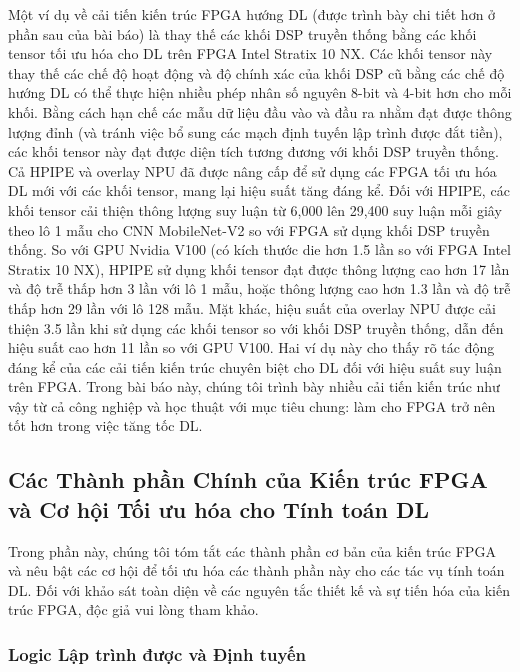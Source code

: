 \documentclass[a4paper]{article}
\begin{document}
    Một ví dụ về cải tiến kiến trúc FPGA hướng DL (được trình bày chi tiết hơn ở phần sau của bài báo) là thay thế các khối DSP truyền thống bằng các khối tensor tối ưu hóa cho DL trên FPGA Intel Stratix 10 NX. Các khối tensor này thay thế các chế độ hoạt động và độ chính xác của khối DSP cũ bằng các chế độ hướng DL có thể thực hiện nhiều phép nhân số nguyên 8-bit và 4-bit hơn cho mỗi khối. Bằng cách hạn chế các mẫu dữ liệu đầu vào và đầu ra nhằm đạt được thông lượng đỉnh (và tránh việc bổ sung các mạch định tuyến lập trình được đắt tiền), các khối tensor này đạt được diện tích tương đương với khối DSP truyền thống. Cả HPIPE và overlay NPU đã được nâng cấp để sử dụng các FPGA tối ưu hóa DL mới với các khối tensor, mang lại hiệu suất tăng đáng kể. Đối với HPIPE, các khối tensor cải thiện thông lượng suy luận từ 6,000 lên 29,400 suy luận mỗi giây theo lô 1 mẫu cho CNN MobileNet-V2 so với FPGA sử dụng khối DSP truyền thống. So với GPU Nvidia V100 (có kích thước die hơn 1.5 lần so với FPGA Intel Stratix 10 NX), HPIPE sử dụng khối tensor đạt được thông lượng cao hơn 17 lần và độ trễ thấp hơn 3 lần với lô 1 mẫu, hoặc thông lượng cao hơn 1.3 lần và độ trễ thấp hơn 29 lần với lô 128 mẫu. Mặt khác, hiệu suất của overlay NPU được cải thiện 3.5 lần khi sử dụng các khối tensor so với khối DSP truyền thống, dẫn đến hiệu suất cao hơn 11 lần so với GPU V100. Hai ví dụ này cho thấy rõ tác động đáng kể của các cải tiến kiến trúc chuyên biệt cho DL đối với hiệu suất suy luận trên FPGA. Trong bài báo này, chúng tôi trình bày nhiều cải tiến kiến trúc như vậy từ cả công nghiệp và học thuật với mục tiêu chung: làm cho FPGA trở nên tốt hơn trong việc tăng tốc DL.

\subsection{Các Thành phần Chính của Kiến trúc FPGA và Cơ hội Tối ưu hóa cho Tính toán DL}
Trong phần này, chúng tôi tóm tắt các thành phần cơ bản của kiến trúc FPGA và nêu bật các cơ hội để tối ưu hóa các thành phần này cho các tác vụ tính toán DL. Đối với khảo sát toàn diện về các nguyên tắc thiết kế và sự tiến hóa của kiến trúc FPGA, độc giả vui lòng tham khảo.

\subsubsection{Logic Lập trình được và Định tuyến}
\end{document}
